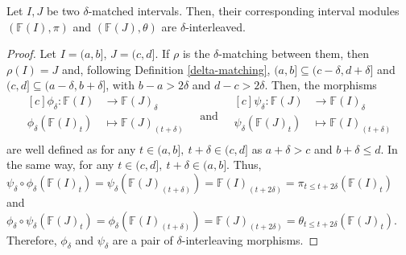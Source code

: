 \begin{lemma} \cite[Exercise 2.2.7]{polterovich} \label{interval-interleaving-if-matching}
    Let $ I, J $ be two $\delta$-matched intervals. Then, their corresponding interval modules $ (\mathbb F (I), \pi) $ and $( \mathbb F (J), \theta) $ are $\delta$-interleaved.
\end{lemma}
\begin{proof}
    Let $ I = (a, b] $, $ J = (c, d] $. If $\rho$ is the $\delta$-matching between them, then $ \rho(I) = J $ and, following Definition \ref{delta-matching}, $ (a, b] \subseteq (c-\delta, d+\delta] $ and $ (c, d] \subseteq (a-\delta, b+\delta] $, with $ b - a > 2\delta $ and $ d - c > 2\delta $. Then, the morphisms
    \begin{equation*}
        \begin{aligned}[c]
        \phi_\delta\colon \mathbb F(I) &\to \mathbb F(J)_\delta\\
        \phi_\delta(\mathbb F(I)_t) &\mapsto \mathbb F(J)_{(t+\delta)}\\
        \end{aligned}
        \quad \text{and} \quad
        \begin{aligned}[c]
        \psi_\delta\colon \mathbb F(J) &\to \mathbb F(I)_\delta\\
        \psi_\delta(\mathbb F(J)_t) &\mapsto \mathbb F(I)_{(t+\delta)}\\
        \end{aligned}
    \end{equation*}
    are well defined as for any $ t \in (a,b], \ t + \delta \in (c, d] $ as $ a + \delta > c $ and $ b + \delta \leq d $. In the same way, for any $ t \in (c,d], \ t + \delta \in (a, b] $. Thus, $ \psi_\delta \circ \phi_\delta (\mathbb F(I)_t) = \psi_\delta(\mathbb F(J)_{(t+\delta)}) = \mathbb F(I)_{(t+2\delta)} = \pi_{t \leq t+2\delta}(\mathbb F(I)_t)$ and $ \phi_\delta \circ \psi_\delta (\mathbb F(J)_t) = \phi_\delta(\mathbb F(I)_{(t+\delta)}) = \mathbb F(J)_{(t+2\delta)} = \theta_{t \leq t+2\delta}(\mathbb F(J)_t)$. Therefore, $ \phi_\delta $ and $ \psi_\delta $ are a pair of $\delta$-interleaving morphisms.
\end{proof}

